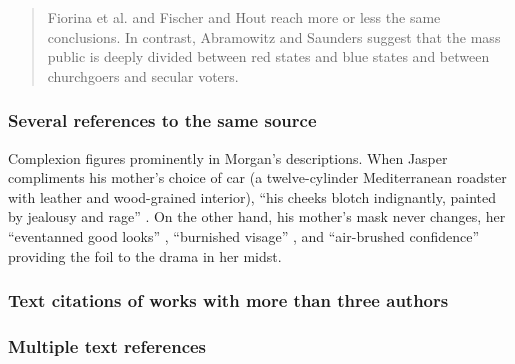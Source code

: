 \documentclass[11pt,letterpaper,oneside]{article}
\begin{document}
\begin{quote} Fiorina et al. \parencite*{fiorina2005} and Fischer and
Hout \parencite*{fischer2006} reach more or less the same conclusions.
In contrast, Abramowitz and Saunders \parencite*{abramowitz2005}
suggest that the mass public is deeply divided between red states and
blue states and between churchgoers and secular voters. \end{quote}

\setcounter{subsubsection}{26}
\subsubsection{Several references to the same source}

\begin{citeref}%
\item Complexion figures prominently in Morgan's descriptions. When
Jasper compliments his mother's choice of car (a twelve-cylinder
Mediterranean roadster with leather and wood-grained interior), ``his
cheeks blotch indignantly, painted by jealousy and rage''
\parencite[47]{chaston2000}. On the other hand, his mother's mask
never changes, her ``even\-tanned good looks''
\parencite[56]{chaston2000}, ``burnished visage''
\parencite[101]{chaston2000}, and ``air-brushed confidence''
\parencite[211]{chaston2000} providing the foil to the drama in her
midst. \end{citeref}

\setcounter{subsubsection}{28}
\subsubsection{Text citations of works with more than three authors}

\begin{citeref}
\item \parencite{schonen2017a}
\item \parencite{schonen2017b}
\end{citeref}

\subsubsection{Multiple text references}

\begin{citeref}
\item \parencite{armstrong1989,beigl1989,pickett1985}
\item \parencites{whittaker1967,whittaker1975,wiens1989a,wiens1989b}
\item \parencites[328]{wong1999}[475]{wong2000}[67]{garcia1998}
\item \parencites{guest2006}[see also][]{stalle2008}{rahn2009}
\end{citeref}
\end{document}
